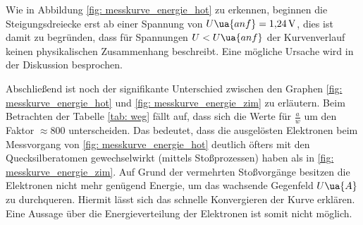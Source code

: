 Wie in Abbildung \ref{fig: messkurve_energie_hot} zu erkennen, beginnen die Steigungsdreiecke erst ab
einer Spannung von $U\ua{anf}=\SI{1.24}{\volt}$, dies ist damit zu begründen, dass für Spannungen $U<U\ua{anf}$ %
der Kurvenverlauf keinen physikalischen Zusammenhang beschreibt. Eine mögliche Ursache wird
in der Diskussion besprochen.

Abschließend ist noch der signifikante Unterschied zwischen den Graphen \ref{fig: messkurve_energie_hot} und \ref{fig: messkurve_energie_zim}
zu erläutern. Beim Betrachten der Tabelle \ref{tab: weg} fällt auf, dass sich die Werte für $\frac{a}{w}$ um den Faktor $\approx 800$ unterscheiden. %
Das bedeutet, dass die ausgelösten Elektronen beim Messvorgang von \ref{fig: messkurve_energie_hot} deutlich öfters mit den %
Quecksilberatomen gewechselwirkt (mittels Stoßprozessen) haben als in \ref{fig: messkurve_energie_zim}. Auf Grund der vermehrten Stoßvorgänge besitzen die Elektronen nicht mehr genügend %
Energie, um das wachsende Gegenfeld $U\ua{A}$ zu durchqueren. Hiermit lässt sich das schnelle Konvergieren der Kurve erklären.
Eine Aussage über die Energieverteilung der Elektronen ist somit nicht möglich.
\FloatBarrier
